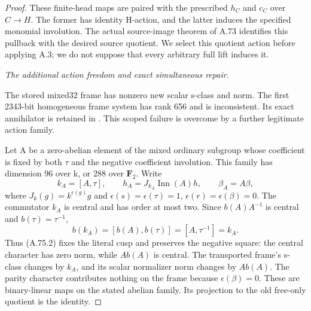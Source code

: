 \begin{proof}
These finite-head maps are paired with the prescribed \(h_C\)
and \(c_C\) over \(C\to H\). The former has identity H-action,
and the latter induces the specified monomial involution. The actual
source-image theorem of A.73 identifies this pullback with the desired
source quotient. We select this quotient action before applying A.3;
we do not suppose that every arbitrary full lift induces it.

\emph{The additional action freedom and exact simultaneous repair.}\par
The stored mixed32 frame has nonzero new scalar s-class and norm.
The first 2343-bit homogeneous frame system has rank 656 and is
inconsistent. Its exact annihilator is retained in
. This scoped failure
is overcome by a further legitimate action family.

Let A be a zero-abelian element of the mixed ordinary subgroup whose
coefficient is fixed by both \(\tau\) and the negative coefficient
involution. This family has dimension 96 over k, or 288 over
\(\mathbf F_2\). Write
\[
 k_A=[A,\tau],\qquad
 h_A=J_{k_A}\operatorname{Inn}(A)h,
 \qquad \beta_A=A\beta,
 \tag{A.75.2}
\]
where \(J_k(g)=k^{\epsilon(g)}g\) and
\(\epsilon(s)=\epsilon(\tau)=1\),
\(\epsilon(r)=\epsilon(\beta)=0\).
The commutator \(k_A\) is central and has order at most two.
Since \(b(A)A^{-1}\) is central and \(b(\tau)=\tau^{-1}\),
\[
 b(k_A)=[b(A),b(\tau)]=[A,\tau^{-1}]=k_A.
\]
Thus (A.75.2) fixes the literal cusp and preserves the negative
square: the central character has zero norm, while
\(A b(A)\) is central. The transported frame's s-class changes
by \(k_A\), and its scalar normalizer norm changes by
\(A b(A)\). The parity character contributes nothing on the
frame because \(\epsilon(\beta)=0\). These are binary-linear
maps on the stated abelian family. Its projection to the old
free-only quotient is the identity.


\end{proof}
